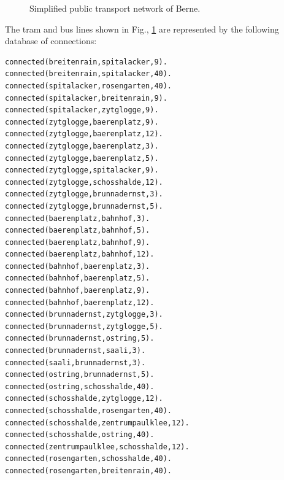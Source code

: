 \documentclass [11pt, a4wide, twoside]{article}
\begin{document}
\solution{}

\newpage
{}

\begin{figure}[h!]
  \caption{Simplified public transport network of Berne.}\label{tram}
\end{figure}

\noindent
The tram and bus lines shown in Fig., \ref{tram} are represented by the following database of connections:

\begin{small}
\begin{verbatim}
connected(breitenrain,spitalacker,9). 
connected(breitenrain,spitalacker,40). 
connected(spitalacker,rosengarten,40). 
connected(spitalacker,breitenrain,9). 
connected(spitalacker,zytglogge,9). 
connected(zytglogge,baerenplatz,9). 
connected(zytglogge,baerenplatz,12). 
connected(zytglogge,baerenplatz,3). 
connected(zytglogge,baerenplatz,5). 
connected(zytglogge,spitalacker,9). 
connected(zytglogge,schosshalde,12). 
connected(zytglogge,brunnadernst,3). 
connected(zytglogge,brunnadernst,5). 
connected(baerenplatz,bahnhof,3). 
connected(baerenplatz,bahnhof,5). 
connected(baerenplatz,bahnhof,9). 
connected(baerenplatz,bahnhof,12). 
connected(bahnhof,baerenplatz,3). 
connected(bahnhof,baerenplatz,5). 
connected(bahnhof,baerenplatz,9). 
connected(bahnhof,baerenplatz,12). 
connected(brunnadernst,zytglogge,3). 
connected(brunnadernst,zytglogge,5). 
connected(brunnadernst,ostring,5). 
connected(brunnadernst,saali,3). 
connected(saali,brunnadernst,3). 
connected(ostring,brunnadernst,5). 
connected(ostring,schosshalde,40). 
connected(schosshalde,zytglogge,12). 
connected(schosshalde,rosengarten,40). 
connected(schosshalde,zentrumpaulklee,12). 
connected(schosshalde,ostring,40). 
connected(zentrumpaulklee,schosshalde,12). 
connected(rosengarten,schosshalde,40). 
connected(rosengarten,breitenrain,40).
\end{verbatim}
\end{small}
\end{document}

